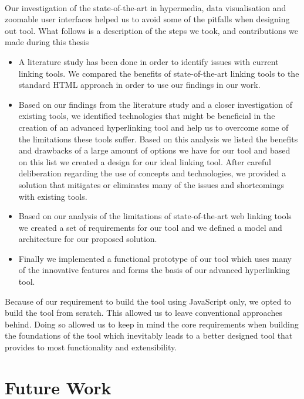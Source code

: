 \paragraph{}
Our investigation of the state-of-the-art in hypermedia, data visualisation and zoomable user interfaces helped us to avoid some of the pitfalls when designing out tool. What follows is a description of the steps we took, and contributions we made during this thesis
\begin{itemize}
	\item A literature study has been done in order to identify issues with current linking tools. We compared the benefits of state-of-the-art linking tools to the standard HTML approach in order to use our findings in our work.
	\item Based on our findings from the literature study and a closer investigation of existing tools, we identified technologies that might be beneficial in the creation of an advanced hyperlinking tool and help us to overcome some of the limitations these tools suffer. Based on this analysis we listed the benefits and drawbacks of a large amount of options we have for our tool and based on this list we created a design for our ideal linking tool. After careful deliberation regarding the use of concepts and technologies, we provided a solution that mitigates or eliminates many of the issues and shortcomings with existing tools.
	\item Based on our analysis of the limitations of state-of-the-art web linking tools we created a set of requirements for our tool and we defined a model and architecture for our proposed solution.
	\item Finally we implemented a functional prototype of our tool which uses many of the innovative features and forms the basis of our advanced hyperlinking tool.
\end{itemize}
Because of our requirement to build the tool using JavaScript only, we opted to build the tool from scratch. This allowed us to leave conventional approaches behind. Doing so allowed us to keep in mind the core requirements when building the foundations of the tool which inevitably leads to a better designed tool that provides to most functionality and extensibility.
\section{Future Work} \label{sec:Future Work}
